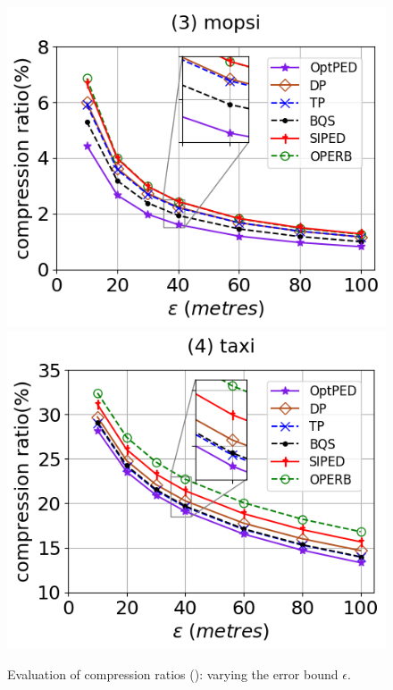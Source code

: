 \begin{figure}[tb!]
	\includegraphics[scale=0.315]{Figures/Exp-PED-CR-epsilon-mopsi.png}		\hspace{1ex}
	\includegraphics[scale=0.315]{Figures/Exp-PED-CR-epsilon-taxi.png}
	\vspace{-2.5ex}
	\caption{\small Evaluation of compression ratios (\ped): varying the error bound $\epsilon$.}
	\label{fig:cr-ped}
	\vspace{-2ex}
\end{figure}

